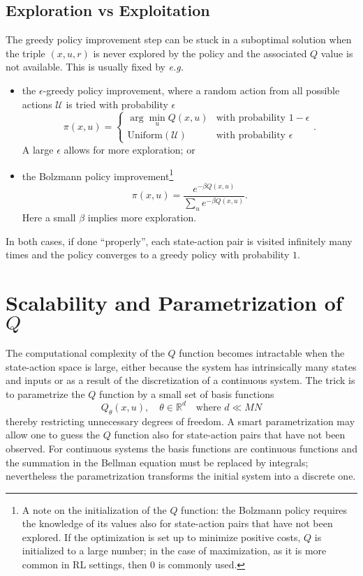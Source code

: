 \subsection{Exploration vs Exploitation}

The greedy policy improvement step can be stuck in a suboptimal solution when the triple $(x,u,r)$ is never explored by the policy and the associated $Q$ value is not available. This is usually fixed by \textit{e.g.}
\begin{itemize}
\item the $\epsilon$-greedy policy improvement, where a random action from all possible actions $\mathcal{U}$ is tried with probability $\epsilon$
  \begin{equation}
    \label{eq:epsilon-greedy-policy-improvement}
    \pi(x,u) =
    \begin{cases}
      \arg \min_u Q(x,u) & \text{with probability }1-\epsilon \\
      \text{Uniform}(\mathcal{U}) & \text{with probability }\epsilon
    \end{cases}.
  \end{equation}
  A large $\epsilon$ allows for more exploration; or
\item the Bolzmann policy improvement\footnote{A note on the initialization of the $Q$ function: the Bolzmann policy requires the knowledge of its values also for state-action pairs that have not been explored. If the optimization is set up to minimize positive costs, $Q$ is initialized to a large number; in the case of maximization, as it is more common in RL settings, then $0$ is commonly used.}
  \begin{equation*}
  \pi(x,u) = \frac{e^{-\beta Q(x,u)}}{\sum_u e^{-\beta Q(x,u)}}.
\end{equation*}
Here a small $\beta$ implies more exploration.
\end{itemize}
In both cases, if done ``properly'', each state-action pair is visited infinitely many times and the policy converges to a greedy policy with probability $1$.

\section{Scalability and Parametrization of $Q$}
\label{sec:RL-Q-parametrization}

The computational complexity of the $Q$ function becomes intractable when the state-action space is large, either because the system has intrinsically many states and inputs or as a result of the discretization of a continuous system. The trick is to parametrize the $Q$ function by a small set of basis functions
\begin{equation*}
  Q_\theta(x,u),\quad \theta \in\mathbb{R}^d\quad \text{where } d\ll MN
\end{equation*}
thereby restricting unnecessary degrees of freedom. A smart parametrization may allow one to guess the $Q$ function also for state-action pairs that have not been observed. For continuous systems the basis functions are continuous functions and the summation in the Bellman equation must be replaced by integrals; nevertheless the parametrization transforms the initial system into a discrete one.

